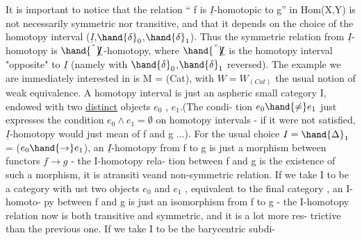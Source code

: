 It is important to notice that the  relation `` f is $\underline{I}$-homotopic
to g'' in Hom(X,Y) is not necessarily symmetric nor transitive,  and that
it depends on the choice of the homotopy interval ($\underline{I}$,$\hand{\delta}_0$,$\hand{\delta}_1$).  Thus the
symmetric relation from  $\underline{I}$-homotopy is $\hand{\check{\phantom{I}}}\!\!\underline{I}$-homotopy,  where  $\hand{\check{\phantom{I}}}\!\!\underline{I}$ is the
homotopy interval "opposite" to $\underline{I}$  (namely with $\hand{\delta}_0$,$\hand{\delta}_1$ reversed).  The
example we are immediately interested in is  M = (Cat),  with $W=W_{(Cat)}$ the
usual notion of weak equivalence.  A homotopy interval is just an aspheric
small category I,  endowed with two \uline{distinct} objects  $e_0$ , $e_1$.(The condi-%
tion $e_0\hand{\neq}e_1$  just expresses the condition $e_0\wedge e_1 = \emptyset$  on homotopy intervals
-  if it were not satisfied,  $\underline{I}$-homotopy would just mean   of f and
g ...).  For the usual choice  $I =\hand{\Delta}_1$ =  ($e_0\hand{\rightarrow} e_1$),  an $\underline{I}$-homotopy from
f to g is just a  morphism  between functors $f\rightarrow g$  -  the I-homotopy rela-%
tion between f and g is the existence of such a morphism,  it is atransiti
ve\hand{,}and  non-symmetric relation.  If we take I to be a category with ust
two objects $e_0$ and $e_1$  ,  equivalent to the final category ,  an I-homoto-%
py between f and g is  just an isomorphism from f to g  -  the I-homotopy
relation now is both transitive and symmetric,  and it is a lot more res-%
trictive than the previous one.  If we take I to be the barycentric subdi-%

